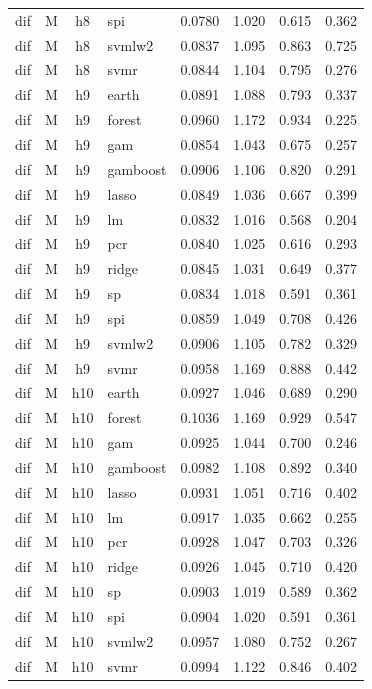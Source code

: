 \begin{ThreePartTable}
\begin{longtable}[t]{llclcccc}
dif & M & h8 & spi & 0.0780 & 1.020 & 0.615 & 0.362\\
dif & M & h8 & svmlw2 & 0.0837 & 1.095 & 0.863 & 0.725\\
dif & M & h8 & svmr & 0.0844 & 1.104 & 0.795 & 0.276\\
\addlinespace
dif & M & h9 & earth & 0.0891 & 1.088 & 0.793 & 0.337\\
dif & M & h9 & forest & 0.0960 & 1.172 & 0.934 & 0.225\\
dif & M & h9 & gam & 0.0854 & 1.043 & 0.675 & 0.257\\
dif & M & h9 & gamboost & 0.0906 & 1.106 & 0.820 & 0.291\\
dif & M & h9 & lasso & 0.0849 & 1.036 & 0.667 & 0.399\\
dif & M & h9 & lm & 0.0832 & 1.016 & 0.568 & 0.204\\
dif & M & h9 & pcr & 0.0840 & 1.025 & 0.616 & 0.293\\
dif & M & h9 & ridge & 0.0845 & 1.031 & 0.649 & 0.377\\
dif & M & h9 & sp & 0.0834 & 1.018 & 0.591 & 0.361\\
dif & M & h9 & spi & 0.0859 & 1.049 & 0.708 & 0.426\\
dif & M & h9 & svmlw2 & 0.0906 & 1.105 & 0.782 & 0.329\\
dif & M & h9 & svmr & 0.0958 & 1.169 & 0.888 & 0.442\\
\addlinespace
dif & M & h10 & earth & 0.0927 & 1.046 & 0.689 & 0.290\\
dif & M & h10 & forest & 0.1036 & 1.169 & 0.929 & 0.547\\
dif & M & h10 & gam & 0.0925 & 1.044 & 0.700 & 0.246\\
dif & M & h10 & gamboost & 0.0982 & 1.108 & 0.892 & 0.340\\
dif & M & h10 & lasso & 0.0931 & 1.051 & 0.716 & 0.402\\
dif & M & h10 & lm & 0.0917 & 1.035 & 0.662 & 0.255\\
dif & M & h10 & pcr & 0.0928 & 1.047 & 0.703 & 0.326\\
dif & M & h10 & ridge & 0.0926 & 1.045 & 0.710 & 0.420\\
dif & M & h10 & sp & 0.0903 & 1.019 & 0.589 & 0.362\\
dif & M & h10 & spi & 0.0904 & 1.020 & 0.591 & 0.361\\
dif & M & h10 & svmlw2 & 0.0957 & 1.080 & 0.752 & 0.267\\
dif & M & h10 & svmr & 0.0994 & 1.122 & 0.846 & 0.402\\

\end{longtable}
\end{ThreePartTable}

